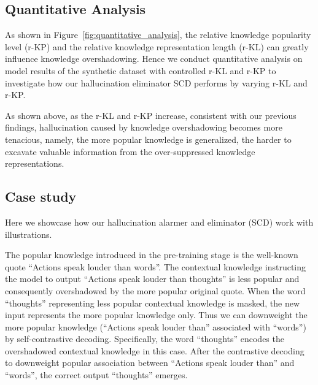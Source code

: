 \subsection{Quantitative Analysis}
As shown in Figure~\ref{fig:quantitative_analysis}, the relative knowledge popularity level (r-KP) and the relative knowledge representation length (r-KL) can greatly influence knowledge overshadowing.
Hence we conduct quantitative analysis on model results of the synthetic dataset with controlled r-KL and r-KP to investigate how our hallucination eliminator SCD performs by varying r-KL and r-KP. 




As shown above, as the r-KL and r-KP increase, consistent with our previous findings, hallucination caused by knowledge overshadowing becomes more tenacious, namely, the more popular knowledge is generalized, the harder to excavate valuable information from the over-suppressed knowledge representations.


\subsection{Case study}

Here we showcase how our hallucination alarmer and eliminator (SCD) work with illustrations.

The popular knowledge introduced in the pre-training stage is the well-known quote ``Actions speak louder than words''. 
The contextual knowledge instructing the model to output ``Actions speak louder than thoughts'' is less popular and consequently overshadowed by the more popular original quote.
When the word ``thoughts'' representing less popular contextual knowledge is masked, the new input represents the more popular knowledge only.
Thus we can downweight the more popular knowledge (``Actions speak louder than'' associated with ``words'') by self-contrastive decoding. 
Specifically, the word ``thoughts'' encodes the overshadowed contextual knowledge in this case. 
After the contrastive decoding to downweight popular association between ``Actions speak louder than'' and ``words'', the correct output ``thoughts'' emerges.